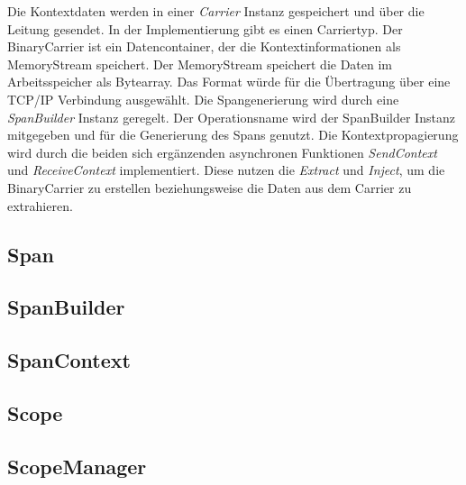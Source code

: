 Die Kontextdaten werden in einer \emph{Carrier} Instanz gespeichert und über die Leitung gesendet. In der Implementierung gibt es einen Carriertyp. Der BinaryCarrier ist ein Datencontainer, der die Kontextinformationen als MemoryStream speichert. Der MemoryStream speichert die Daten im Arbeitsspeicher als Bytearray. Das Format würde für die Übertragung über eine TCP/IP Verbindung ausgewählt. 
Die Spangenerierung wird durch eine \emph{SpanBuilder} Instanz geregelt. Der Operationsname wird der SpanBuilder Instanz mitgegeben und für die Generierung des Spans genutzt. Die Kontextpropagierung wird durch die beiden sich ergänzenden asynchronen Funktionen \emph{SendContext} und \emph{ReceiveContext} implementiert. Diese nutzen die \emph{Extract} und \emph{Inject}, um die BinaryCarrier zu erstellen beziehungsweise die Daten aus dem Carrier zu extrahieren.


\subsection{Span}
\label{subsection:Span}

\subsection{SpanBuilder}
\label{subsection:SpanBuilder}

\subsection{SpanContext}
\label{subsection:SpanContext}

\subsection{Scope}
\label{subsection:Scope}

\subsection{ScopeManager}
\label{subsection:SpanManager}

